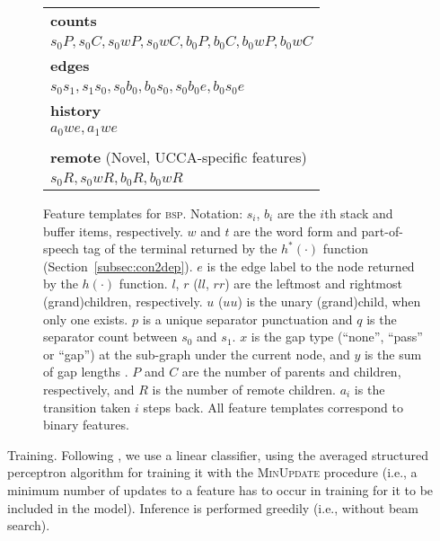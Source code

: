 \documentclass[11pt]{article}
\makeatletter
\newcommand{\secref}[1]{Section~\ref{#1}}
\renewcommand{\paragraph}{
  \@startsection{paragraph}{4}
  {\z@}{.5ex \@plus .5ex \@minus .2ex}{-1em}
  {\normalfont\normalsize\bfseries}
}
\makeatother
\begin{document}
\begin{figure}
\begin{adjustbox}{margin=3pt,frame}
\begin{tabular}{>{\small}l}
\textbf{counts} \\
$s_0P, s_0C, s_0wP, s_0wC, b_0P, b_0C, b_0wP, b_0wC$ \\
\textbf{edges} \\
$s_0s_1, s_1s_0, s_0b_0, b_0s_0, s_0b_0e, b_0s_0e$ \\
\textbf{history} \\
$a_0we, a_1we$ \\
\\
\textbf{remote} (Novel, UCCA-specific features) \\
$s_0R, s_0wR, b_0R, b_0wR$
\end{tabular}
\end{adjustbox}

\caption{\label{fig:features}
  Feature templates for \textsc{bsp}. Notation:
  $s_i$, $b_i$ are the $i$th stack and buffer items, respectively.
  $w$ and $t$ are the word form and part-of-speech tag of the terminal returned by the $h^*(\cdot)$ function (\secref{subsec:con2dep}).
  $e$ is the edge label to the node returned by the $h(\cdot)$ function.
  $l$, $r$ ($ll$, $rr$) are the leftmost and rightmost (grand)children, respectively.
  $u$ ($uu$) is the unary (grand)child, when only one exists.
  $p$ is a unique separator punctuation and $q$ is the separator count between $s_0$ and $s_1$.
  $x$ is the gap type (``none'', ``pass'' or ``gap'') at the sub-graph under the current node, and $y$ is the sum of gap lengths \protect\cite{Maier:Lichte:11}.
  $P$ and $C$ are the number of parents and children, respectively, and $R$ is the number of remote children.
  $a_i$ is the transition taken $i$ steps back.
  All feature templates correspond to binary features.
}
\end{figure}

\paragraph{Training.}
Following , we use a linear classifier, using
the averaged structured perceptron algorithm for training it
\cite{Coll:04} with the \textsc{MinUpdate} \cite{goldberg2011learning} procedure
(i.e., a minimum number of updates to a feature has to occur in training for it
to be included in the model). Inference is performed greedily (i.e., without beam search).
\end{document}
